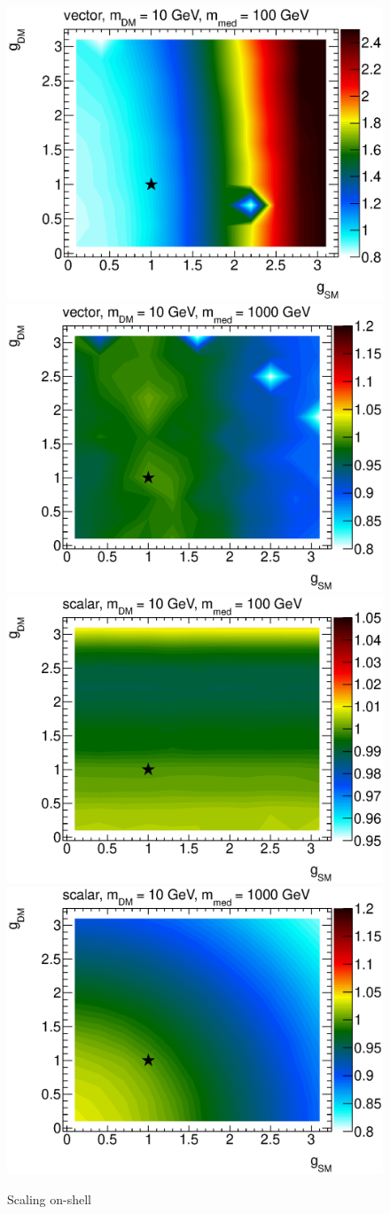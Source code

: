 \begin{figure}
\centering
\includegraphics[width=0.45\linewidth]{figures/monojet/scaling_V_10_100.eps}
\includegraphics[width=0.45\linewidth]{figures/monojet/scaling_V_10_1000.eps}\\
\includegraphics[width=0.45\linewidth]{figures/monojet/scaling_S_10_100.eps}
\includegraphics[width=0.45\linewidth]{figures/monojet/scaling_S_10_1000.eps}\\
\caption{Scaling on-shell}
\label{fig:monojet_scaling}
\end{figure}

